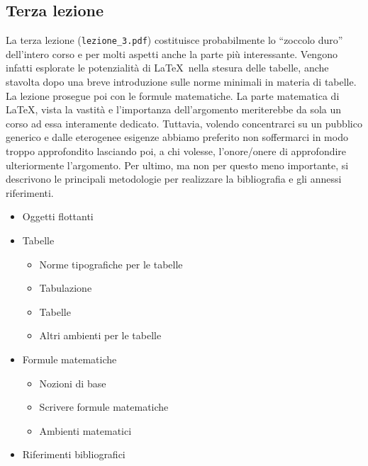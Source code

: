 \documentclass[a4paper,12pt]{article}
\begin{document}
\subsection{Terza lezione}
La terza lezione (\texttt{lezione\_3.pdf}) costituisce probabilmente
lo ``zoccolo duro'' dell'intero corso e per molti aspetti anche la
parte pi\`u interessante. Vengono infatti esplorate le potenzialit\`a
di \LaTeX\ nella stesura delle tabelle, anche stavolta dopo una breve
introduzione sulle norme minimali in materia di tabelle. La lezione
prosegue poi con le formule matematiche. La parte matematica di
\LaTeX, vista la vastit\`a e l'importanza dell'argomento meriterebbe
da sola un corso ad essa interamente dedicato. Tuttavia, volendo
concentrarci su un pubblico generico e dalle eterogenee esigenze
abbiamo preferito non soffermarci in modo troppo approfondito
lasciando poi, a chi volesse, l'onore/onere di approfondire
ulteriormente l'argomento. Per ultimo, ma non per questo meno
importante, si descrivono le principali metodologie per realizzare la
bibliografia e gli annessi riferimenti. 
	\begin{itemize}
	\item Oggetti flottanti
	\item Tabelle
		\begin{itemize}
		\item Norme tipografiche per le tabelle
		\item Tabulazione
		\item Tabelle
		\item Altri ambienti per le tabelle
		\end{itemize}
	\item Formule matematiche
		\begin{itemize}
		\item Nozioni di base
		\item Scrivere formule matematiche
		\item Ambienti matematici
		\end{itemize}
	\item Riferimenti bibliografici
	\end{itemize}
\end{document}
